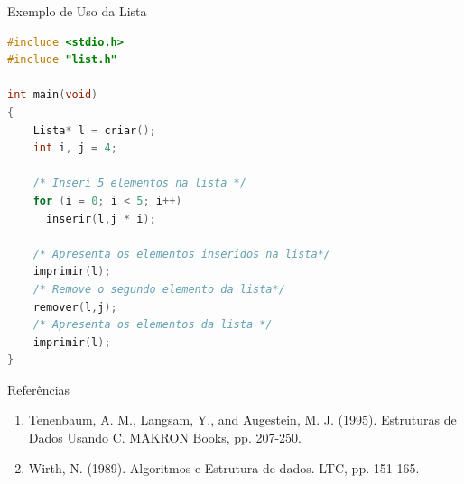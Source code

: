 \begin{frame}[fragile,c]{Exemplo de Uso da Lista}
\footnotesize
\begin{lstlisting}[language=C]
#include <stdio.h>
#include "list.h"

int main(void)
{
    Lista* l = criar();
    int i, j = 4;
    
    /* Inseri 5 elementos na lista */
    for (i = 0; i < 5; i++)
      inserir(l,j * i);
    
    /* Apresenta os elementos inseridos na lista*/    
    imprimir(l);
    /* Remove o segundo elemento da lista*/
    remover(l,j);
    /* Apresenta os elementos da lista */    
    imprimir(l);        
}
\end{lstlisting}
\end{frame} 


\begin{frame}{Referências}
	\begin{enumerate}
		\item Tenenbaum, A. M., Langsam, Y., and Augestein, M. J. (1995). Estruturas de Dados Usando C. MAKRON Books, pp. 207-250.
		\item Wirth, N. (1989). Algoritmos e Estrutura de dados. LTC, pp. 151-165.
	\end{enumerate}
\end{frame}
